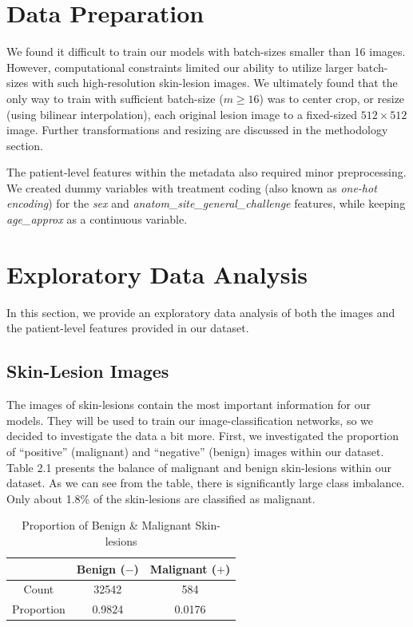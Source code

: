 \documentclass [MAS] {uclathes}
\begin{document}
\section{Data Preparation}

We found it difficult to train our models with batch-sizes smaller than 16 images. However, computational constraints limited our ability to utilize larger batch-sizes with such high-resolution skin-lesion images. We ultimately found that the only way to train with sufficient batch-size ($m \geq 16$) was to center crop, or resize (using bilinear interpolation), each original lesion image to a fixed-sized $512 \times 512$ image. Further transformations and resizing are discussed in the methodology section.

The patient-level features within the metadata also required minor preprocessing. We created dummy variables with treatment coding (also known as \textit{one-hot encoding}) for the \textit{sex} and \textit{anatom\_site\_general\_challenge} features, while keeping \textit{age\_approx} as a continuous variable.


\section{Exploratory Data Analysis}

In this section, we provide an exploratory data analysis of both the images and the patient-level features provided in our dataset.

\subsection{Skin-Lesion Images}

The images of skin-lesions contain the most important information for our models. They will be used to train our image-classification networks, so we decided to investigate the data a bit more. First, we investigated the proportion of ``positive'' (malignant) and ``negative'' (benign) images within our dataset. Table 2.1 presents the balance of malignant and benign skin-lesions within our dataset. As we can see from the table, there is significantly large class imbalance. Only about 1.8\% of the skin-lesions are classified as malignant. 

\begin{table}[h!]
\centering
\begin{tabular}{| c | c | c |} 
\hline
& Benign ($-$) & Malignant ($+$) \\ 
\hline
\hline
Count & 32542 & 584\\
\hline
Proportion & 0.9824 & 0.0176\\
\hline  
\end{tabular}
\label{tab:propMel}
\caption{Proportion of Benign \& Malignant Skin-lesions}
\end{table}
\end{document}
